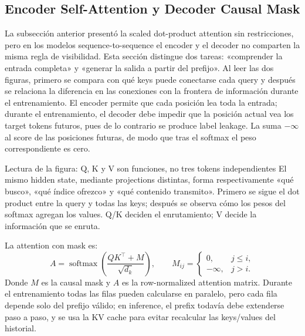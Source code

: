 \subsection{Encoder Self-Attention y Decoder Causal Mask}

La subsección anterior presentó la scaled dot-product attention sin restricciones, pero en los modelos sequence-to-sequence el encoder y el decoder no comparten la misma regla de visibilidad. Esta sección distingue dos tareas: «comprender la entrada completa» y «generar la salida a partir del prefijo». Al leer las dos figuras, primero se compara con qué keys puede conectarse cada query y después se relaciona la diferencia en las conexiones con la frontera de información durante el entrenamiento. El encoder permite que cada posición lea toda la entrada; durante el entrenamiento, el decoder debe impedir que la posición actual vea los target tokens futuros, pues de lo contrario se produce label leakage. La  suma $-\infty$ al score de las posiciones futuras, de modo que tras el softmax el peso correspondiente es cero.


\begin{knowledgebox}{Lectura de la figura: Q, K y V son funciones, no tres tokens independientes}
El mismo hidden state, mediante projections distintas, forma respectivamente «qué busco», «qué índice ofrezco» y «qué contenido transmito». Primero se sigue el dot product entre la query y todas las keys; después se observa cómo los pesos del softmax agregan los values. Q/K deciden el enrutamiento; V decide la información que se enruta.
\end{knowledgebox}


La attention con mask es:
\[
A=\operatorname{softmax}\!\left(\frac{QK^\top+M}{\sqrt{d_k}}\right),\qquad
M_{ij}=\begin{cases}0,&j\le i,\\-\infty,&j>i.\end{cases}
\]
Donde $M$ es la causal mask y $A$ es la row-normalized attention matrix. Durante el entrenamiento todas las filas pueden calcularse en paralelo, pero cada fila depende solo del prefijo válido; en inference, el prefix todavía debe extenderse paso a paso, y se usa la KV cache para evitar recalcular las keys/values del historial.

